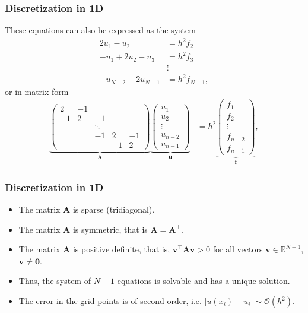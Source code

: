 \begin{frame}
  \frametitle{Discretization in 1D}
  These equations can also be expressed as the system
  \begin{align*}
    2u_1 - u_2 &= h^2 f_2 \\
    -u_1 + 2u_2 - u_3 &= h^2 f_3 \\
               &\vdots \\
    -u_{N-2} + 2u_{N-1} &= h^2 f_{N-1},
  \end{align*}
  or in matrix form
  \begin{align*}
    \underbrace{ \begin{pmatrix}
      2 & -1 & & & \\
      -1 & 2 & -1 & & \\
      & & \ddots & & \\
      & & -1 & 2 & -1 \\
      & & & -1 & 2
    \end{pmatrix}
    }_{\bm A}
    \underbrace{ \begin{pmatrix}
      u_1 \\
      u_2 \\
      \vdots \\
      u_{n-2} \\
      u_{n-1}
    \end{pmatrix}
    }_{\bm u}
    &= h^2
    \underbrace{ \begin{pmatrix}
      f_1 \\
      f_2 \\
      \vdots \\
      f_{n-2} \\
      f_{n-1}
    \end{pmatrix}
    }_{\bm f} ,
  \end{align*}
\end{frame}

\begin{frame}
  \frametitle{Discretization in 1D}
  \begin{itemize}
  \item The matrix $\bm A$ is sparse (tridiagonal).
  \item The matrix $\bm A$ is symmetric, that is $\bm A = \bm A^\intercal$.
  \item The matrix $\bm A$ is positive definite, that is,
    $\bm v^\intercal \bm A \bm v > 0$
    for all vectors $\bm v \in \mathbb{R}^{N-1}$, $\bm v \not= \bm 0$.
  \item Thus, the system of $N-1$ equations is solvable and has a unique
    solution.
  \item The error in the grid points is of second order, i.e.
    $|u(x_i)-u_i| \sim \mathcal{O}(h^2)$.
  \end{itemize}
\end{frame}

